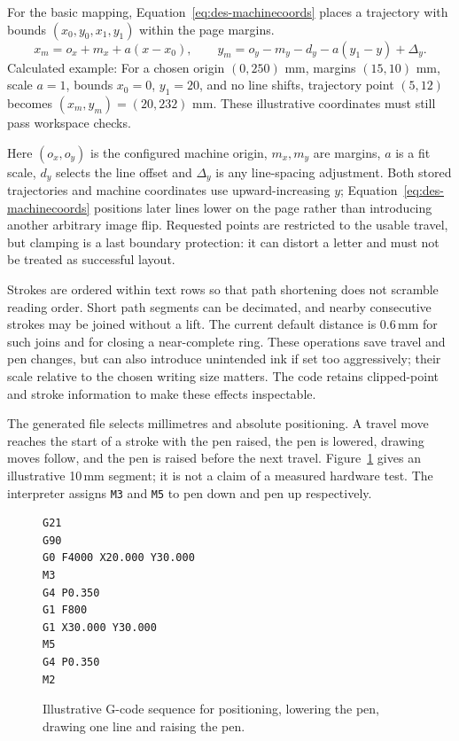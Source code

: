 For the basic mapping, Equation~\ref{eq:des-machinecoords} places a trajectory with bounds $(x_0,y_0,x_1,y_1)$ within the page margins.
\begin{equation}
x_m=o_x+m_x+a(x-x_0),\qquad
y_m=o_y-m_y-d_y-a(y_1-y)+\Delta_y.
\label{eq:des-machinecoords}
\end{equation}
Calculated example: For a chosen origin $(0,250)$ mm, margins $(15,10)$ mm, scale $a=1$, bounds $x_0=0$, $y_1=20$, and no line shifts, trajectory point $(5,12)$ becomes $(x_m,y_m)=(20,232)$ mm. These illustrative coordinates must still pass workspace checks.

Here $(o_x,o_y)$ is the configured machine origin, $m_x,m_y$ are margins, $a$ is a fit scale, $d_y$ selects the line offset and $\Delta_y$ is any line-spacing adjustment. Both stored trajectories and machine coordinates use upward-increasing $y$; Equation~\ref{eq:des-machinecoords} positions later lines lower on the page rather than introducing another arbitrary image flip. Requested points are restricted to the usable travel, but clamping is a last boundary protection: it can distort a letter and must not be treated as successful layout.

Strokes are ordered within text rows so that path shortening does not scramble reading order. Short path segments can be decimated, and nearby consecutive strokes may be joined without a lift. The current default distance is 0.6\,mm for such joins and for closing a near-complete ring. These operations save travel and pen changes, but can also introduce unintended ink if set too aggressively; their scale relative to the chosen writing size matters. The code retains clipped-point and stroke information to make these effects inspectable.

The generated file selects millimetres and absolute positioning. A travel move reaches the start of a stroke with the pen raised, the pen is lowered, drawing moves follow, and the pen is raised before the next travel. Figure~\ref{fig:des-gcode-excerpt} gives an illustrative 10\,mm segment; it is not a claim of a measured hardware test. The interpreter assigns \texttt{M3} and \texttt{M5} to pen down and pen up respectively.


\begin{figure}[!htbp]
\begin{lstlisting}[style=designcode]
G21
G90
G0 F4000 X20.000 Y30.000
M3
G4 P0.350
G1 F800
G1 X30.000 Y30.000
M5
G4 P0.350
M2
\end{lstlisting}
\caption{Illustrative G-code sequence for positioning, lowering the pen, drawing one line and raising the pen.}
\label{fig:des-gcode-excerpt}
\end{figure}

